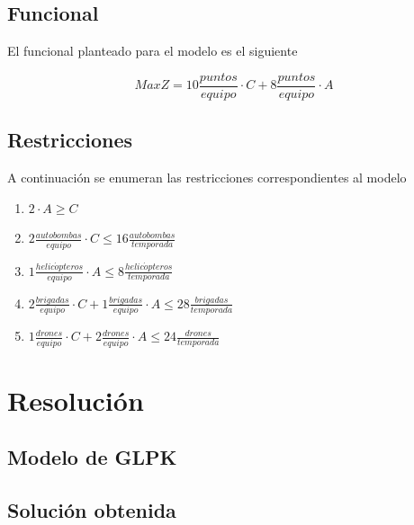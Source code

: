 \documentclass[12pt]{article}
\begin{document}
\subsection{Funcional}

El funcional planteado para el modelo es el siguiente

$$Max Z = 10\frac{puntos}{equipo} \cdot C + 8\frac{puntos}{equipo} \cdot A$$

\subsection{Restricciones}

A continuación se enumeran las restricciones correspondientes al modelo

\begin{enumerate}[label=(\textbf{\arabic*})]
    \item $2 \cdot A \geq C$
    \item $2 \frac{autobombas}{equipo} \cdot C \leq 16 \frac{autobombas}{temporada}$
    \item $1 \frac{helic\acute{o}pteros}{equipo} \cdot A \leq 8 \frac{helic\acute{o}pteros}{temporada}$
    \item $2 \frac{brigadas}{equipo} \cdot C + 1 \frac{brigadas}{equipo} \cdot A \leq 28 \frac{brigadas}{temporada}$
    \item $1 \frac{drones}{equipo} \cdot C + 2 \frac{drones}{equipo} \cdot A \leq 24 \frac{drones}{temporada}$
\end{enumerate}

\pagebreak
\section{Resolución}

\subsection{Modelo de GLPK}



\subsection{Solución obtenida}

\begin{lrbox}{\myv}\begin{minipage}{\textwidth}

\end{minipage}\end{lrbox}
\end{document}
